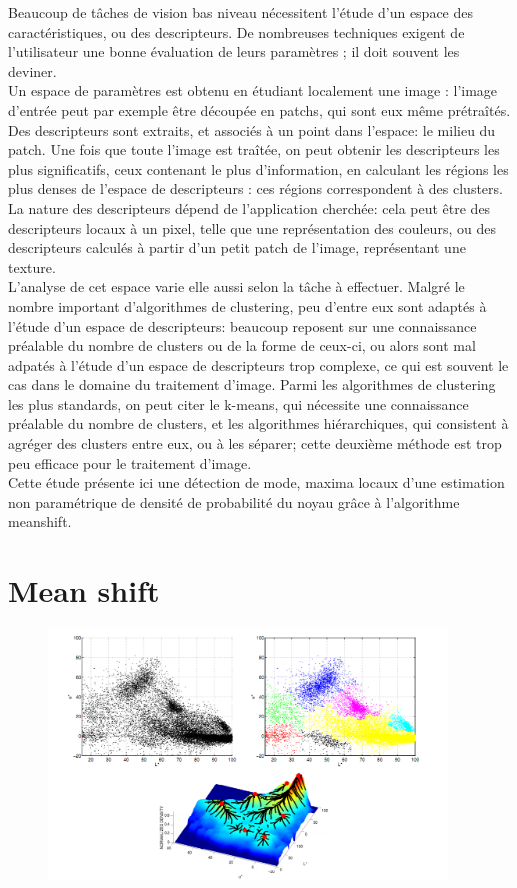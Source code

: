 \documentclass{article}
\begin{document}
Beaucoup de tâches de vision bas niveau nécessitent l'étude d'un espace des
caractéristiques, ou des descripteurs. De nombreuses techniques exigent de
l'utilisateur une bonne évaluation de leurs paramètres ; il doit souvent les
deviner. \\
Un espace de paramètres est obtenu en étudiant localement une image : l'image
d'entrée peut par exemple être découpée en patchs, qui sont eux même
prétraîtés. Des descripteurs sont extraits, et associés à un point dans
l'espace: le milieu du patch. Une fois que toute l'image est traîtée, on peut
obtenir les descripteurs les plus significatifs, ceux
contenant le plus d'information,  en calculant les régions les plus denses de
l'espace de descripteurs : ces régions correspondent à des clusters. \\
La nature des descripteurs dépend de l'application cherchée: cela peut être
des descripteurs locaux à un pixel, telle que une représentation des couleurs,
ou des descripteurs calculés à partir d'un petit patch de l'image,
représentant une texture. \\
L'analyse de cet espace varie elle aussi selon la tâche à effectuer. Malgré
le nombre important d'algorithmes de clustering, peu d'entre eux sont adaptés à
l'étude d'un espace de descripteurs: beaucoup reposent sur une connaissance
préalable du nombre de clusters ou de la forme de ceux-ci, ou alors sont mal
adpatés à l'étude d'un espace de descripteurs trop complexe, ce qui est
souvent le cas dans le domaine du traitement d'image. Parmi les algorithmes de
clustering les plus standards, on peut citer le k-means, qui nécessite une
connaissance préalable du nombre de clusters, et les algorithmes hiérarchiques, qui
consistent à agréger des clusters entre eux, ou à les séparer; cette deuxième
méthode est trop peu
efficace pour le traitement d'image. \\
Cette étude présente ici une détection de mode, maxima locaux d'une estimation non
paramétrique de densité de probabilité du noyau grâce à l'algorithme meanshift.


\section{Mean shift}

\begin{figure}
\begin{center}
\includegraphics[width=400px]{images/mean_shift_color_space.png}
\end{center}
\end{figure}
\end{document}
